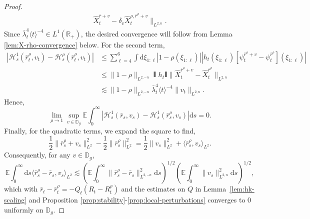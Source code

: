 \documentclass[11pt, a4paper]{scrartcl}
\numberwithin{equation}{section}
\theoremstyle{plain}
\theoremstyle{remark}
\newcommand{\mathd}{\mathrm{d}}
\begin{document}
\begin{proof}
\[\begin{aligned}
			\hat{X}_t^{\bar{r} + v} - \delta_v  \hat{X}_t^{\rho, \bar{r}^{\rho} +
					v} \|_{L^{2, n}} .
		\end{aligned} \]
	Since $\bar{\lambda}_t^4 \langle t \rangle^{- 4} \in L^1 (\mathbb{R}_+)$, the
	desired convergence will follow from Lemma \ref{lem:X-rho-convergence}
	below. For the second term,
	\[ \begin{aligned}
			| \mathcal{H}_s^1 (\bar{r}^{\rho}_t, v_t) -\mathcal{H}_s^{\rho}
			(\bar{r}^{\rho}_t, v_t) | & \leqslant  \sum_{\ell = 4}^6 \int \mathd
			\xi_{1 : \ell} | 1 - \rho (\xi_{1 : \ell}) |  | h_t (\xi_{1 : \ell})
			[\psi^{\bar{r}^{\rho} + v}_t - \psi^{\bar{r}^{\rho}}_t] (\xi_{1 :
			\ell}) |                                                                                       \\
			                          & \leqslant  \| 1 - \rho \|_{L^{2, - n}} \interleave h_t \interleave
			\| \hat{X}_t^{\bar{r}^{\rho} + v} - \hat{X}_t^{\bar{r}^{\rho}}
			\|_{L^{2, n}}                                                                                  \\
			                          & \lesssim  \| 1 - \rho \|_{L^{2, - n}} \bar{\lambda}_t^4 \langle t
			\rangle^{- 4}  \| v_t \|_{L^{2, n}} .
		\end{aligned} \]
	Hence,
	\[ \lim_{\rho \rightarrow 1} \sup_{v \in \mathbb{D}_g} \mathbb{E}
		\int_0^{\infty} | \mathcal{H}_s^1 (\bar{r}_s, v_s) -\mathcal{H}_s^1
		(\bar{r}^{\rho}_s, v_s) | \mathd s = 0. \]
	Finally, for the quadratic terms, we expand the square to find,
	\[ \frac{1}{2} \| \bar{r}^{\rho}_s + v_s \|^2_{L^2} - \frac{1}{2} \|
		\bar{r}^{\rho}_s \|^2_{L^2} = \frac{1}{2} \| v_s \|^2_{L^2} + \langle
		\bar{r}^{\rho}_s, v_s \rangle_{L^2} . \]
	Consequently, for any $v \in \mathbb{D}_g$,
	\[ \mathbb{E} \int_0^{\infty} \mathd s \langle \bar{r}^{\rho}_s -
		\bar{r}_s, v_s \rangle_{L^2} \lesssim \left( \mathbb{E} \int_0^{\infty}
		\| \bar{r}^{\rho}_s - \bar{r}_s \|^2_{L^{2, - n}} \mathd s \right)^{1 /
			2} \left( \mathbb{E} \int_0^{\infty} \| v_s \|^2_{L^{2, n}} \mathd s
		\right)^{1 / 2}, \]
	which with $\bar{r}_t - \bar{r}^{\rho}_t = - Q_t (R_t - R_t^{\rho})$ and the
	estimates on $Q$ in Lemma~\ref{lem:hk-scaling} and Proposition
	\ref{prop:stability}-\ref{prop:local-perturbations} converges to $0$
	uniformly on $\mathbb{D}_g$.


\end{proof}
\end{document}
